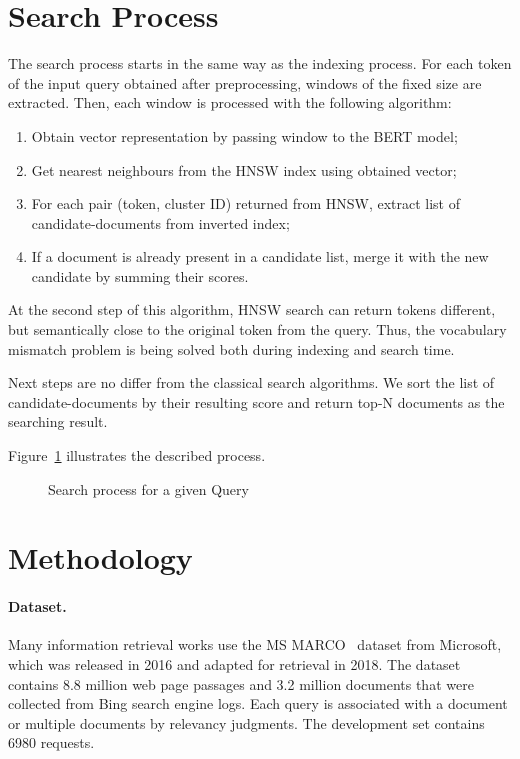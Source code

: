 \documentclass[
    twocolumn,
]{template/ceurart}
\begin{document}
    \section{Search Process}
    The search process starts in the same way as the indexing process.
    For each token of the input query obtained after preprocessing, windows of the fixed size are extracted.
    Then, each window is processed with the following algorithm:
    \begin{enumerate}
        \item Obtain vector representation by passing window to the BERT model;
        \item Get nearest neighbours from the HNSW index using obtained vector;
        \item For each pair (token, cluster ID) returned from HNSW, extract list of candidate-documents from inverted index;
        \item If a document is already present in a candidate list, merge it with the new candidate by summing their scores.
    \end{enumerate}

    At the second step of this algorithm, HNSW search can return tokens different,
    but semantically close to the original token from the query.
    Thus, the vocabulary mismatch problem is being solved both during indexing and search time.

    Next steps are no differ from the classical search algorithms.
    We sort the list of candidate-documents by their resulting score and return top-N documents as the searching result.

    Figure~\ref{fig:searchProcess} illustrates the described process.
    \begin{figure}
        \centering
        
        \caption{Search process for a given Query}
        \label{fig:searchProcess}
    \end{figure}


    \section{Methodology}

    \paragraph{Dataset.}
    Many information retrieval works use the MS MARCO~\cite{msMarco} dataset from Microsoft,
    which was released in 2016 and adapted for retrieval in 2018.
    The dataset contains 8.8 million web page passages and 3.2 million documents that were collected
    from Bing search engine logs.
    Each query is associated with a document or multiple documents by relevancy judgments.
    The development set contains 6980 requests.
\end{document}
